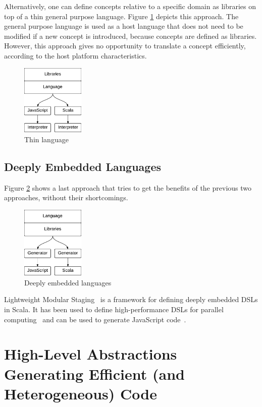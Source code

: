 \documentclass[preprint]{sigplanconf}
\begin{document}
Alternatively, one can define concepts relative to a specific domain as libraries on top of a thin general purpose
language. Figure \ref{thin-lang} depicts this approach. The general purpose language is used as a host language that
does not need to be modified if a new concept is introduced, because concepts are defined as libraries. However,
this approach gives no opportunity to translate a concept efficiently, according to the host platform
characteristics.

\begin{figure}
  \centering
  \includegraphics[width=3cm]{thin.pdf}
  \caption{Thin language}
  \label{thin-lang}
\end{figure}

\subsection{Deeply Embedded Languages}

Figure \ref{dedsl} shows a last approach that tries to get the benefits of the previous two approaches, without
their shortcomings.

\begin{figure}
  \centering
  \includegraphics[width=3cm]{lms.pdf}
  \caption{Deeply embedded languages}
  \label{dedsl}
\end{figure}

Lightweight Modular Staging~\cite{Rompf12_LMSThesis} is a framework for defining deeply embedded DSLs in Scala. It
has been used to define high-performance DSLs for parallel computing~\cite{Brown11_Parallel} and can be used to
generate JavaScript code~\cite{Kossakowski12_JsDESL}.

\section{High-Level Abstractions Generating Efficient (and Heterogeneous) Code}
\label{contribution}
\end{document}
